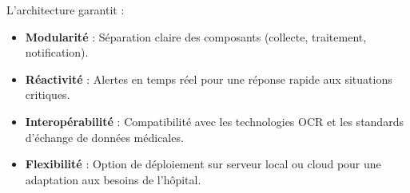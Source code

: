 L’architecture garantit :
\begin{itemize}
    \item \textbf{Modularité} : Séparation claire des composants (collecte, traitement, notification).
    \item \textbf{Réactivité} : Alertes en temps réel pour une réponse rapide aux situations critiques.
    \item \textbf{Interopérabilité} : Compatibilité avec les technologies OCR et les standards d’échange de données médicales.
    \item \textbf{Flexibilité} : Option de déploiement sur serveur local ou cloud pour une adaptation aux besoins de l’hôpital.
\end{itemize}